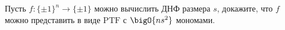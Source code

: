 Пусть $f\colon \{\pm 1\}^n \to \{\pm 1\}$ можно вычислить ДНФ размера $s$, докажите, что $f$ можно
представить в виде $\mathrm{PTF}$ с $\bigO{n s^2}$ мономами.
